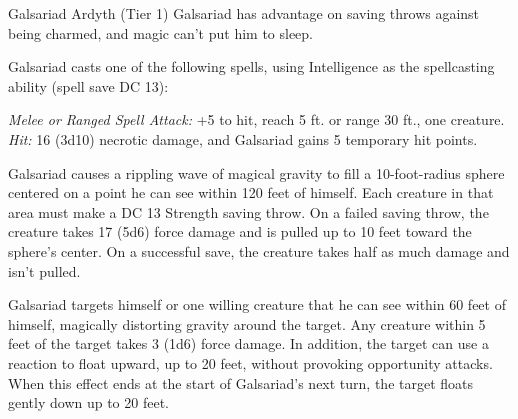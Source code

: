 \documentclass[10pt,a4paper,twoside,twocolumn,openany,nodeprecatedcode]{dndbook}
\begin{document}
\begin{DndMonster}[float=ht]{Galsariad Ardyth (Tier 1)}
\DndMonsterBasics[
armor-class = {12},
hit-points = {\DndDice{14d8 - 14}},
speed = {30 ft.}
]
\DndMonsterAbilityScores[
 str = 8,
 dex = 14,
 con = 8,
 int = 16,
 wis = 15,
 cha = 12
]
\DndMonsterDetails[
saving-throws = {Int +5, Wis +4},
skills = {Arcana +5, Investigation +5, Nature +5},
senses = {darkvision 120 ft., passive perception 12},
languages = {Common, Draconic, Undercommon},
challenge = 3,
]
Galsariad has advantage on saving throws against being charmed, and magic can't put him to sleep.

Galsariad casts one of the following spells, using Intelligence as the spellcasting ability (spell save DC 13):
\begin{DndMonsterSpells}
\end{DndMonsterSpells}
\par
{}
\textsl{Melee or Ranged Spell Attack:} +5 to hit, reach 5 ft. or range 30 ft., one creature. \textsl{Hit:} 16 (3d10) necrotic damage, and Galsariad gains 5 temporary hit points.

Galsariad causes a rippling wave of magical gravity to fill a 10-foot-radius sphere centered on a point he can see within 120 feet of himself. Each creature in that area must make a DC 13 Strength saving throw. On a failed saving throw, the creature takes 17 (5d6) force damage and is pulled up to 10 feet toward the sphere's center. On a successful save, the creature takes half as much damage and isn't pulled.

\par
{}
Galsariad targets himself or one willing creature that he can see within 60 feet of himself, magically distorting gravity around the target. Any creature within 5 feet of the target takes 3 (1d6) force damage. In addition, the target can use a reaction to float upward, up to 20 feet, without provoking opportunity attacks. When this effect ends at the start of Galsariad's next turn, the target floats gently down up to 20 feet.

\end{DndMonster}
\end{document}
